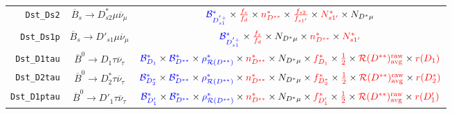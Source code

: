 \begin{landscape}
\begin{table}
\begin{tabular}{r|c|c}
     \texttt{Dst\_Ds2} &           $\overline{B}_s \rightarrow D_{s2}^* \mu \overline{\nu}_\mu$            &                                                                                      $\textcolor{blue}{\mathcal{B}^{*}_{D_{s1}^{'+}}} \times \textcolor{red}{\frac{f_s}{f_d}} \times \textcolor{red}{n^{*}_{D^{**}}} \times \textcolor{red}{\frac{f_{s2}}{f_{s1'}}} \times \textcolor{red}{N^*_{s1'}} \times N_{D^* \mu}$                                                                                       \\
    \texttt{Dst\_Ds1p} &            $\overline{B}_s \rightarrow D'_{s1} \mu \overline{\nu}_\mu$            &                                                                                                              $\textcolor{blue}{\mathcal{B}^{*}_{D_{s1}^{'+}}} \times \textcolor{red}{\frac{f_s}{f_d}} \times N_{D^* \mu} \times \textcolor{red}{n^{*}_{D^{**}}} \times \textcolor{red}{N^*_{s1'}}$                                                                                                              \\
   \texttt{Dst\_D1tau} &             $\overline{B}^0 \rightarrow D_1 \tau \overline{\nu}_\tau$             &              $\textcolor{blue}{\mathcal{B}^{*}_{D_1}} \times \textcolor{blue}{\mathcal{B}^*_{D^{**}}} \times \textcolor{blue}{\rho_{\mathcal{R}(D^{**})}^*} \times \textcolor{red}{n^{*}_{D^{**}}} \times N_{D^* \mu} \times \textcolor{red}{f^{*}_{D_1}} \times \textcolor{red}{\frac{1}{2}} \times \textcolor{red}{\mathcal{R}(D^{**})_\text{avg}^\text{raw}} \times \textcolor{red}{r({D_1})}$               \\
   \texttt{Dst\_D2tau} &            $\overline{B}^0 \rightarrow D^*_2 \tau \overline{\nu}_\tau$            &           $\textcolor{blue}{\mathcal{B}^{*}_{D_2^*}} \times \textcolor{blue}{\mathcal{B}^*_{D^{**}}} \times \textcolor{blue}{\rho_{\mathcal{R}(D^{**})}^*} \times \textcolor{red}{n^{*}_{D^{**}}} \times N_{D^* \mu} \times \textcolor{red}{f^{*}_{D_2^*}} \times \textcolor{red}{\frac{1}{2}} \times \textcolor{red}{\mathcal{R}(D^{**})_\text{avg}^\text{raw}} \times \textcolor{red}{r({D_2^*})}$            \\
  \texttt{Dst\_D1ptau} &            $\overline{B}^0 \rightarrow D'_1 \tau \overline{\nu}_\tau$             &             $\textcolor{blue}{\mathcal{B}^{*}_{D'_1}} \times \textcolor{blue}{\mathcal{B}^*_{D^{**}}} \times \textcolor{blue}{\rho_{\mathcal{R}(D^{**})}^*} \times \textcolor{red}{n^{*}_{D^{**}}} \times N_{D^* \mu} \times \textcolor{red}{f^{*}_{D'_1}} \times \textcolor{red}{\frac{1}{2}} \times \textcolor{red}{\mathcal{R}(D^{**})_\text{avg}^\text{raw}} \times \textcolor{red}{r({D'_1})}$             \\

\end{tabular}
\end{table}
\end{landscape}
